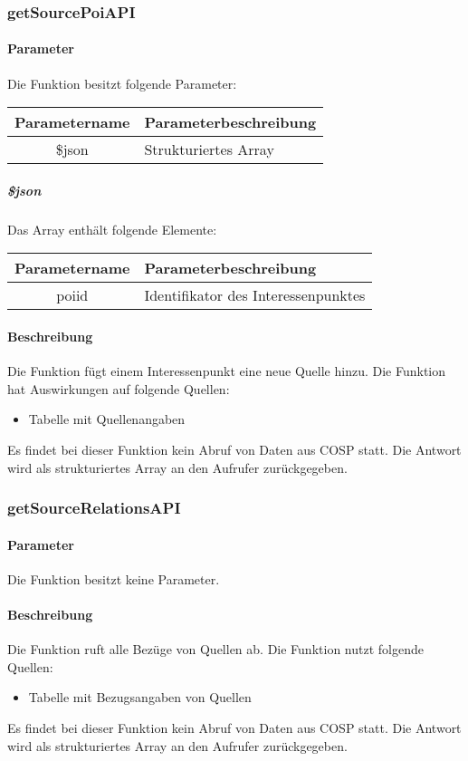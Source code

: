 \subsubsection{getSourcePoiAPI}
\paragraph{Parameter} Die Funktion besitzt folgende Parameter:
\begin{table}[H]
	\begin{tabular}{|c|p{11cm}|}
		\hline
		\textbf{Parametername} & \textbf{Parameterbeschreibung} \\ \hline
		\$json & Strukturiertes Array \\ \hline
	\end{tabular}
\end{table}
\subparagraph{\$json}Das Array enthält folgende Elemente:
\begin{table}[H]
	\begin{tabular}{|c|p{11cm}|}
		\hline
		\textbf{Parametername} & \textbf{Parameterbeschreibung} \\ \hline
		poiid      & Identifikator des Interessenpunktes \\ \hline
	\end{tabular}
\end{table}
\paragraph{Beschreibung} Die Funktion fügt einem Interessenpunkt eine neue Quelle hinzu. Die Funktion hat Auswirkungen auf folgende Quellen:
\begin{itemize}
	\item Tabelle mit Quellenangaben
\end{itemize}
Es findet bei dieser Funktion kein Abruf von Daten aus {\glqq COSP\grqq} statt. Die Antwort wird als strukturiertes Array an den Aufrufer zurückgegeben.
\subsubsection{getSourceRelationsAPI}
\paragraph{Parameter} Die Funktion besitzt keine Parameter.
\paragraph{Beschreibung} Die Funktion ruft alle Bezüge von Quellen ab. Die Funktion nutzt folgende Quellen:
\begin{itemize}
	\item Tabelle mit Bezugsangaben von Quellen
\end{itemize}
Es findet bei dieser Funktion kein Abruf von Daten aus {\glqq COSP\grqq} statt. Die Antwort wird als strukturiertes Array an den Aufrufer zurückgegeben.
